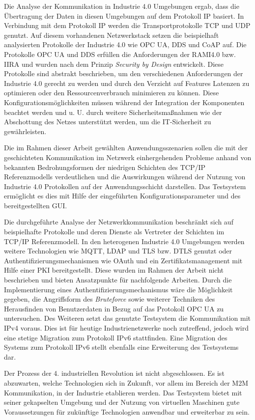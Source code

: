 Die Analyse der Kommunikation in Industrie 4.0 Umgebungen ergab, dass die Übertragung der Daten in diesen Umgebungen auf dem Protokoll \ac{IP} basiert. In Verbindung mit dem Protokoll \ac{IP} werden die Transportprotokolle \ac{TCP} und \ac{UDP} genutzt. Auf diesem vorhandenen Netzwerkstack setzen die beispielhaft analysierten Protokolle der Industrie 4.0 wie \ac{OPC UA}, \ac{DDS} und \ac{CoAP} auf. Die Protokolle \ac{OPC UA} und \ac{DDS} erfüllen die Anforderungen der \ac{RAMI4.0} bzw. \ac{IIRA} und wurden nach dem Prinzip \textit{Security by Design} entwickelt. Diese Protokolle sind abstrakt beschrieben, um den verschiedenen Anforderungen der Industrie 4.0 gerecht zu werden und durch den Verzicht auf Features Latenzen zu optimieren oder den Ressourcenverbrauch minimieren zu können. Diese Konfigurationsmöglichkeiten müssen während der Integration der Komponenten beachtet werden und u. U. durch weitere Sicherheitsmaßnahmen wie der Abschottung des Netzes unterstützt werden, um die \ac{IT}-Sicherheit zu gewährleisten.

Die im Rahmen dieser Arbeit gewählten Anwendungsszenarien sollen die mit der geschichteten Kommunikation im Netzwerk einhergehenden Probleme anhand von bekannten Bedrohungsformen der niedrigen Schichten des \ac{TCP}/\ac{IP} Referenzmodells verdeutlichen und die Auswirkungen während der Nutzung von Industrie 4.0 Protokollen auf der Anwendungsschicht darstellen. Das Testsystem ermöglicht es dies mit Hilfe der eingeführten Konfigurationsparameter und des bereitgestellten \ac{GUI}.

Die durchgeführte Analyse der Netzwerkkommunikation beschränkt sich auf beispielhafte Protokolle und deren Dienste als Vertreter der Schichten im \ac{TCP}/\ac{IP} Referenzmodell. In den heterogenen Industrie 4.0 Umgebungen werden weitere Technologien wie \ac{MQTT}, \ac{LDAP} und \ac{TLS} bzw. \ac{DTLS} genutzt oder Authentifizierungsmechanismen wie \ac{OAuth} und ein Zertifikatsmanagement mit Hilfe einer \ac{PKI} bereitgestellt. Diese wurden im Rahmen der Arbeit nicht beschrieben und bieten Ansatzpunkte für nachfolgende Arbeiten. Durch die Implementierung eines Authentifizierungsmechanismus wäre die Möglichkeit gegeben, die Angriffsform des \textit{Bruteforce} sowie weiterer Techniken des Herausfinden von Benutzerdaten in Bezug auf das Protokoll \ac{OPC UA} zu untersuchen. Des Weiteren setzt das genutzte Testsystem die Kommunikation mit \ac{IP}v4 voraus. Dies ist für heutige Industrienetzwerke noch zutreffend, jedoch wird eine stetige Migration zum Protokoll \ac{IP}v6 stattfinden. Eine Migration des Systems zum Protokoll \ac{IP}v6 stellt ebenfalls eine Erweiterung des Testsystems dar.

Der Prozess der 4. industriellen Revolution ist nicht abgeschlossen. Es ist abzuwarten, welche Technologien sich in Zukunft, vor allem im Bereich der \ac{M2M} Kommunikation, in der Industrie etablieren werden. Das Testsystem bietet mit seiner gekapselten Umgebung und der Nutzung von virtuellen Maschinen gute Voraussetzungen für zukünftige Technologien anwendbar und erweiterbar zu sein.